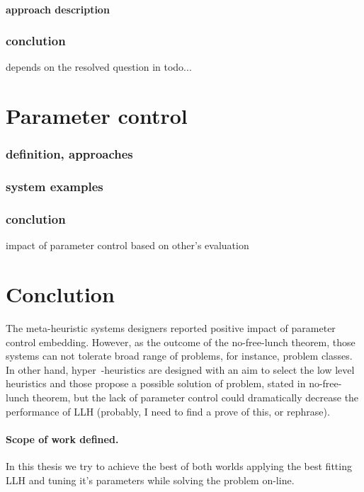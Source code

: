 \paragraph{approach description}

\subsubsection{conclution}
depends on the resolved question in todo...


\section{Parameter control}
\subsubsection{definition, approaches}
\subsubsection{system examples}
\subsubsection{conclution} impact of parameter control based on other's evaluation


\section{Conclution}

The meta-heuristic systems designers reported positive impact of parameter control embedding. 
However, as the outcome of the no-free-lunch theorem, those systems can not tolerate broad range of problems, for instance, problem classes.
In other hand, hyper~-heuristics are designed with an aim to select the low level heuristics and those propose a possible solution of problem, stated in no-free-lunch theorem, but the lack of parameter control could dramatically decrease the performance of LLH (probably, I need to find a prove of this, or rephrase).

\paragraph{Scope of work defined.} In this thesis we try to achieve the best of both worlds applying the best fitting LLH and tuning it's parameters while solving the problem on-line.
